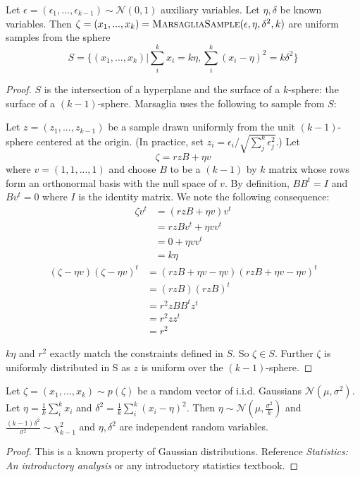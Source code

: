 \begin{theorem}
Let $\epsilon = (\epsilon_1, ..., \epsilon_{k-1}) \sim \mathcal{N}(0, 1)$ auxiliary variables.  Let $\eta, \delta$ be known variables. Then $\zeta = (x_1, ..., x_k) = \textsc{MarsagliaSample}(\epsilon, \eta, \delta^2, k)$ are uniform samples from the sphere
\[S = \{(x_1, ..., x_k) | \sum_i^k x_i = k\eta, \sum_i^k(x_i - \eta)^2 = k \delta^2\}\]
\begin{proof}
$S$ is the intersection of a hyperplane and the surface of a $k$-sphere: the surface of a $(k-1)$-sphere. Marsaglia uses the following to sample from $S$:

Let $z = (z_1, ..., z_{k-1})$ be a sample drawn uniformly from the unit $(k-1)$-sphere centered at the origin. (In practice, set $z_i = \epsilon_i / \sqrt{\sum_j^k \epsilon_j^2}$.) Let
\begin{equation*}
    \zeta = rzB + \eta v
\end{equation*}
where $v = (1, 1, ..., 1)$ and choose $B$ to be a $(k-1)$ by $k$ matrix whose rows form an orthonormal basis with the null space of $v$. By definition, $BB^t = I$ and $Bv^t = 0$ where $I$ is the identity matrix. We note the following consequence:
\begin{align*}
    \zeta v^t &= (rzB + \eta v)v^t\\
                 &= rzBv^t + \eta vv^t\\
                 &= 0 + \eta vv^t\\
                 &= k\eta
\end{align*}
\begin{align*}
    (\zeta - \eta v)(\zeta - \eta v)^t &=
    (rzB + \eta v - \eta v)(rzB + \eta v - \eta v)^t\\
    &= (rzB)(rzB)^t \\
    &= r^2zBB^tz^t \\
    &= r^2zz^t \\
    &= r^2
\end{align*}

$k\eta$ and $r^2$ exactly match the constraints defined in $S$. So $\zeta \in S$. Further $\zeta$ is uniformly distributed in S as $z$ is uniform over the $(k-1)$-sphere.
\end{proof}
\label{theorem:2}
\end{theorem}

\begin{theorem} Let  $\zeta
= (x_1, ..., x_k)
\sim p(\zeta)$  be a random vector of i.i.d. Gaussians $\mathcal{N}(\mu, \sigma^2)$. Let $\eta=\frac{1}{k}\sum_i^k x_i$ and $\delta^2 = \frac{1}{k}\sum_i^k (x_i - \eta)^2$. Then
$\eta \sim \mathcal{N}(\mu, \frac{\sigma^2}{k})$ and $\frac{(k-1)\delta^2}{\sigma^2} \sim \chi^2_{k-1}$ and $\eta,\delta^2$ are independent random variables.
\begin{proof}
This is a known property of Gaussian distributions. Reference \textit{Statistics: An introductory analysis} or any introductory statistics textbook.
\end{proof}
\label{marginal:1}
\end{theorem}

